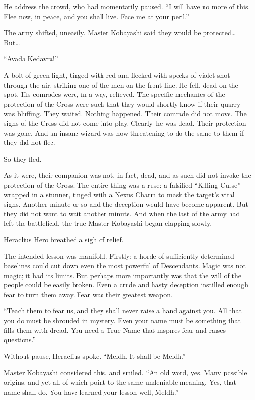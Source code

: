 He address the crowd, who had momentarily paused. “I will have no more of this. Flee now, in peace, and you shall live. Face me at your peril.”

The army shifted, uneasily. Master Kobayashi said they would be protected… But…

“Avada Kedavra!”

A bolt of green light, tinged with red and flecked with specks of violet shot through the air, striking one of the men on the front line. He fell, dead on the spot. His comrades were, in a way, relieved. The specific mechanics of the protection of the Cross were such that they would shortly know if their quarry was bluffing. They waited. Nothing happened. Their comrade did not move. The signs of the Cross did not come into play. Clearly, he was dead. Their protection was gone. And an insane wizard was now threatening to do the same to them if they did not flee.

So they fled.

As it were, their companion was not, in fact, dead, and as such did not invoke the protection of the Cross. The entire thing was a ruse: a falsified “Killing Curse” wrapped in a stunner, tinged with a Nexus Charm to mask the target’s vital signs. Another minute or so and the deception would have become apparent. But they did not want to wait another minute. And when the last of the army had left the battlefield, the true Master Kobayashi began clapping slowly.

Heraclius Hero breathed a sigh of relief.

The intended lesson was manifold. Firstly: a horde of sufficiently determined baselines could cut down even the most powerful of Descendants. Magic was not magic; it had its limits. But perhaps more importantly was that the will of the people could be easily broken. Even a crude and hasty deception instilled enough fear to turn them away. Fear was their greatest weapon.

“Teach them to fear us, and they shall never raise a hand against you. All that you do must be shrouded in mystery. Even your name must be something that fills them with dread. You need a True Name that inspires fear and raises questions.”

Without pause, Heraclius spoke. “Meldh. It shall be Meldh.”

Master Kobayashi considered this, and smiled. “An old word, yes. Many possible origins, and yet all of which point to the same undeniable meaning. Yes, that name shall do. You have learned your lesson well, Meldh.”

